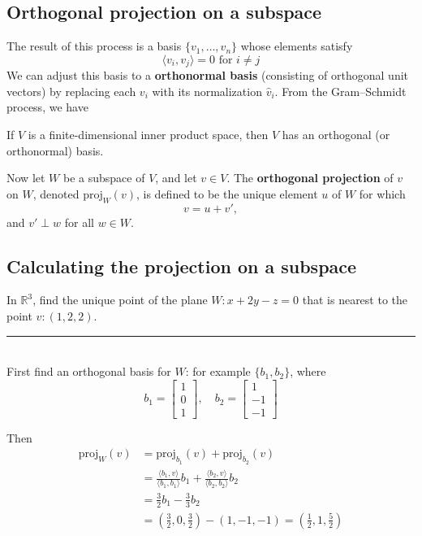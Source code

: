 \documentclass[a4paper, 9pt]{extarticle}
\begin{document}
\subsection{Orthogonal projection on a subspace}
The result of this process is a basis $\{v_1, \dots, v_n\}$ whose elements satisfy
$$
  \langle v_i, v_j \rangle = 0 \text{ for } i \ne j
$$
We can adjust this basis to a \textbf{orthonormal basis} (consisting of orthogonal unit vectors) by replacing each $v_i$ with its normalization $\hat{v}_i$.
From the Gram–Schmidt process, we have

\begin{theorembox}{}{}
  If $V$ is a finite-dimensional inner product space, then $V$ has an orthogonal (or orthonormal) basis.
\end{theorembox}
Now let $W$ be a subspace of $V$, and let $v \in V$. The \textbf{orthogonal projection} of $v$ on $W$, denoted $\text{proj}_W(v)$, is defined to be the unique element $u$ of $W$ for which
$$
  v = u + v',
$$
and $v' \perp w$ for all $w \in W$.
\subsection{Calculating the projection on a subspace}
\begin{examplebox}
  In $\mathbb{R}^3$, find the unique point of the plane $W : x + 2y - z = 0$
  that is nearest to the point $v : (1, 2, 2)$.
  \\ \rule{\textwidth}{1pt}\\
  First find an orthogonal basis for $W$: for example $\{b_1, b_2\}$, where
  $$
    b_1 = \begin{bmatrix} 1 \\ 0 \\ 1 \end{bmatrix}, \quad
    b_2 = \begin{bmatrix} 1 \\ -1 \\ -1 \end{bmatrix}
  $$

  Then
  \begin{align*}
    \text{proj}_W(v) & = \text{proj}_{b_1}(v) + \text{proj}_{b_2}(v)                                                                               \\
                     & = \frac{\langle b_1, v \rangle}{\langle b_1, b_1 \rangle} b_1 + \frac{\langle b_2, v \rangle}{\langle b_2, b_2 \rangle} b_2 \\
                     & = \frac{3}{2} b_1 - \frac{3}{3} b_2                                                                                         \\
                     & = \left( \frac{3}{2}, 0, \frac{3}{2} \right) - (1, -1, -1) = \left( \frac{1}{2}, 1, \frac{5}{2} \right)
  \end{align*}
\end{examplebox}
\end{document}
